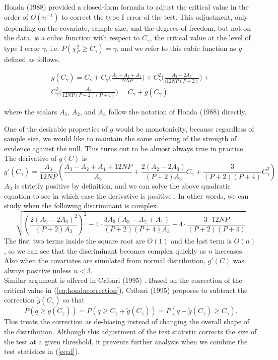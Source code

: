 \documentclass[aap, preprint]{imsart}
\numberwithin{equation}{section}
\theoremstyle{plain}
\begin{document}
Honda (1988) provided a closed-form formula to adjust the critical value in the order of $O(n^{-1})$ to correct the type I error of the test. This adjustment, only depending on the covariate, sample size, and the degrees of freedom, but not on the data, is a cubic function with respect to $C_{\gamma}$, the critical value at the level of type I error $\gamma$, i.e. $P(\chi_{P}^2 \geq C_{\gamma}) = \gamma$, and we refer to this cubic function as $g$ defined as follows.

\begin{equation}
    \begin{multlined}
g(C_{\gamma}) = C_{\gamma} + C_{\gamma}\bigg(\frac{A_3 - A_2 + A_1}{12NP}\bigg) + C_{\gamma}^2\bigg(\frac{A_2 - 2A_3}{(12NP(P+2)}\bigg) +\\
C_{\gamma}^3 \bigg(\frac{A_3}{12NP(P+2)(P+4)}\bigg) = C_{\gamma} + \tilde{g}(C_{\gamma})
\end{multlined}
\label{eq:hondacorrection}
\end{equation}

where the scalars $A_1$, $A_2$, and $A_3$ follow the notation of Honda (1988) directly. 

\vspace{5mm}  
One of the desirable properties of $g$ would be monotonicity, because regardless of sample size, we would like to maintain the same ordering of the strength of evidence against the null. This turns out to be almost always true in practice. The derivative of $g(C)$ is 
$$g'(C_{\gamma}) = \frac{A_3}{12NP}\left( \frac{A_3-A_2+A_1+12NP}{A_3} + 
 \frac{2(A_2-2A_3)}{(P+2)A_3}C_{\gamma} + \frac{3}{(P+2)(P+4)}C_{\gamma}^2 \right)$$
$A_3$ is strictly positive by definition, and we can solve the above quadratic equation to see in which case the derivative is positive \cite{cribari1995improved}. In other words, we can study when the following discriminant is complex.
$$\sqrt{\left(\frac{2(A_2-2A_3)^2}{(P+2)A_3}\right)^2 - 4\cdot\frac{3A_3(A_3-A_2+A_1)}{(P+2)(P+4)A_3} - 4\cdot
\frac{3 \cdot 12NP}{(P+2)(P+4)}}$$
The first two terms inside the square root are $O(1)$ and the last term is $O(n)$, so we can see that the discriminant becomes complex quickly as $n$ increases. Also when the covariates are simulated from normal distribution, $g'(C)$ was always positive unless $n<3$. \\


Similar argument is offered in Cribari (1995) \cite{cribari1995improved}. Based on the correction of the critical value in (\ref{eq:hondacorrection}), Cribari (1995) proposes to subtract the correction $\tilde{g}(C_{\gamma})$ so that
$$P(q  \geq g(C_{\gamma})) = P(q \geq C_{\gamma} + \tilde{g}(C_{\gamma})) = P(q - \tilde{g}(C_{\gamma}) \geq C_{\gamma}).$$
This treats the correction as de-biasing instead of changing the overall shape of the distribution. Although this adjustment of the test statistic corrects the size of the test at a given threshold, it prevents further analysis when we combine the test statistics in (\ref{eq:d}). 
\end{document}
